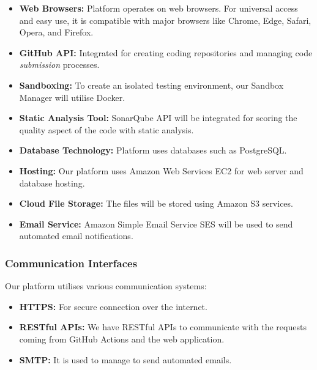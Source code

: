 \begin{itemize}
    \item \textbf{Web Browsers:} Platform operates on web browsers. For universal access and easy use, it is compatible with major browsers like Chrome, Edge, Safari, Opera, and Firefox.

    \item \textbf{GitHub API:} Integrated for creating coding repositories and managing code \textit{submission} processes.

    \item \textbf{Sandboxing:} To create an isolated testing environment, our Sandbox Manager will utilise Docker.

    \item \textbf{Static Analysis Tool:} SonarQube API will be integrated for scoring the quality aspect of the code with static analysis. 

    \item \textbf{Database Technology:} Platform uses databases such as PostgreSQL.

    \item \textbf{Hosting:} Our platform uses Amazon Web Services EC2 for web server and database hosting.

    \item \textbf{Cloud File Storage:} The files will be stored using Amazon S3 services.

    \item \textbf{Email Service:} Amazon Simple Email Service SES will be used to send automated email notifications.
\end{itemize}

\subsubsection{Communication Interfaces}
Our platform utilises various communication systems:

\begin{itemize}
    \item \textbf{HTTPS:} For secure connection over the internet.

    \item \textbf{RESTful APIs:} We have RESTful APIs to communicate with the requests coming from GitHub Actions and the web application.

    \item \textbf{SMTP:} It is used to manage to send automated emails.
\end{itemize}





